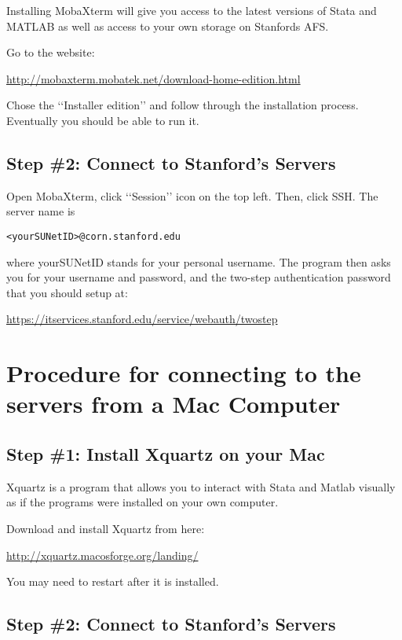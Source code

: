 \documentclass[12pt]{article}
\begin{document}
Installing MobaXterm will give you access to the latest versions of Stata and MATLAB as well as access to your own storage on Stanfords AFS. 

Go to the website:

\url{http://mobaxterm.mobatek.net/download-home-edition.html}

Chose the \lq\lq{}Installer edition\rq\rq{} and follow through the installation process. Eventually you should be able to run it. 


\subsection{Step \#2: Connect to Stanford's Servers}

Open MobaXterm, click \lq\lq{}Session\rq\rq{} icon on the top left. Then, click SSH. The server name is 

\begin{lstlisting}
<yourSUNetID>@corn.stanford.edu
\end{lstlisting}
 
where yourSUNetID stands for your personal username. The program then asks you for your username and password, and the two-step authentication password that you should setup at:

\url{https://itservices.stanford.edu/service/webauth/twostep}








\section{Procedure for connecting to the servers from a Mac Computer}

\subsection{Step \#1: Install Xquartz on your Mac}

Xquartz is a program that allows you to interact with Stata and Matlab visually as if the programs were installed on your own computer.

Download and install Xquartz from here:

\url{http://xquartz.macosforge.org/landing/}

You may need to restart after it is installed.


\subsection{Step \#2: Connect to Stanford's Servers}
\end{document}
